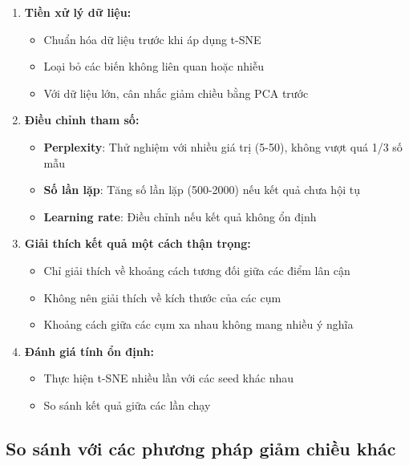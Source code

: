 \documentclass[
]{article}
\providecommand{\tightlist}{%
  \setlength{\itemsep}{0pt}\setlength{\parskip}{0pt}}
\begin{document}
\begin{enumerate}
\def\labelenumi{\arabic{enumi}.}
\tightlist
\item
  \textbf{Tiền xử lý dữ liệu:}

  \begin{itemize}
  \tightlist
  \item
    Chuẩn hóa dữ liệu trước khi áp dụng t-SNE
  \item
    Loại bỏ các biến không liên quan hoặc nhiễu
  \item
    Với dữ liệu lớn, cân nhắc giảm chiều bằng PCA trước
  \end{itemize}
\item
  \textbf{Điều chỉnh tham số:}

  \begin{itemize}
  \tightlist
  \item
    \textbf{Perplexity}: Thử nghiệm với nhiều giá trị (5-50), không vượt
    quá 1/3 số mẫu
  \item
    \textbf{Số lần lặp}: Tăng số lần lặp (500-2000) nếu kết quả chưa hội
    tụ
  \item
    \textbf{Learning rate}: Điều chỉnh nếu kết quả không ổn định
  \end{itemize}
\item
  \textbf{Giải thích kết quả một cách thận trọng:}

  \begin{itemize}
  \tightlist
  \item
    Chỉ giải thích về khoảng cách tương đối giữa các điểm lân cận
  \item
    Không nên giải thích về kích thước của các cụm
  \item
    Khoảng cách giữa các cụm xa nhau không mang nhiều ý nghĩa
  \end{itemize}
\item
  \textbf{Đánh giá tính ổn định:}

  \begin{itemize}
  \tightlist
  \item
    Thực hiện t-SNE nhiều lần với các seed khác nhau
  \item
    So sánh kết quả giữa các lần chạy
  \end{itemize}
\end{enumerate}

\subsection{So sánh với các phương pháp giảm chiều
khác}\label{so-suxe1nh-vux1edbi-cuxe1c-phux1b0ux1a1ng-phuxe1p-giux1ea3m-chiux1ec1u-khuxe1c}
\end{document}
